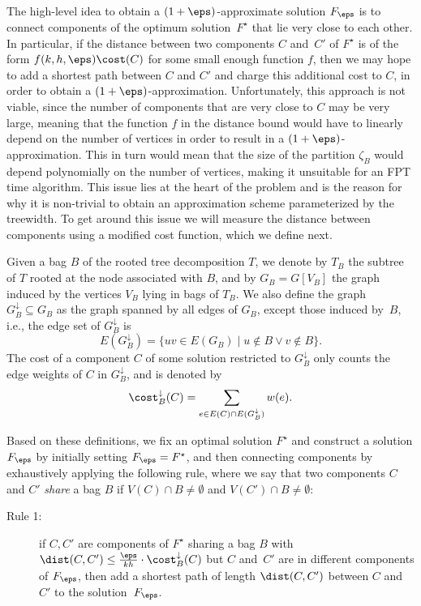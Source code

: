 The high-level idea to obtain a $(1+\eps)$-approximate solution $F_\eps$ is to connect components of the optimum solution~$F^\star$ that lie very close to each other. In particular, if the distance between two components $C$ and~$C'$ of $F^\star$ is of the form $f(k,h,\eps)\cost(C)$ for some small enough function $f$, then we may hope to add a shortest path between $C$ and $C'$ and charge this additional cost to $C$, in order to obtain a $(1+\eps)$-approximation. Unfortunately, this approach is not viable, since the number of components that are very close to $C$ may be very large, meaning that the function $f$ in the distance bound would have to linearly depend on the number of vertices in order to result in a $(1+\eps)$-approximation. This in turn would mean that the size of the partition $\zeta_B$ would depend polynomially on the number of vertices, making it unsuitable for an FPT time algorithm. This issue lies at the heart of the problem and is the reason for why it is non-trivial to obtain an approximation scheme parameterized by the treewidth. To get around this issue we will measure the distance between components using a modified cost function, which we define next.

Given a bag $B$ of the rooted tree decomposition $T$, we denote by $T_B$
the subtree of $T$ rooted at the node associated with $B$, and by $G_B=G[V_B]$ the graph induced by 
the vertices $V_B$ lying in bags of $T_B$. We also define the graph 
$G^\downarrow_B\subseteq G_B$ as the graph spanned by all edges of $G_B$, 
except those induced by~$B$, i.e., the edge set of $G^\downarrow_B$ is
\[
E(G^\downarrow_B)=\{uv\in E(G_B)\mid u\notin B\lor v\notin B\}.
\] 
The cost of a component $C$ of some \SF solution restricted to $G^\downarrow_B$
only counts the edge weights of $C$ in $G^\downarrow_B$, and is denoted by
\[
\cost^\downarrow_B(C)=\sum_{e\in E(C)\cap E(G^\downarrow_B)}w(e).
\]

Based on these definitions, we fix an optimal solution $F^\star$ and construct
a solution $F_\eps$ by initially setting $F_\eps=F^\star$, and then connecting
components by exhaustively applying the following rule, where we say that two
components $C$ and $C'$ \emph{share} a bag $B$ if $V(C)\cap B\neq\emptyset$ and
$V(C')\cap B\neq\emptyset$:

\begin{description}
    \item[Rule 1:] if $C,C'$ are components of $F^\star$ sharing a bag $B$ with $\dist(C,C')\le\frac{\eps}{kh}\cdot\cost^\downarrow_B(C)$ but $C$ and~$C'$ are in different components of $F_\eps$, then add a shortest path of length $\dist(C,C')$ between $C$ and~$C'$ to the solution~$F_\eps$.
\end{description}

